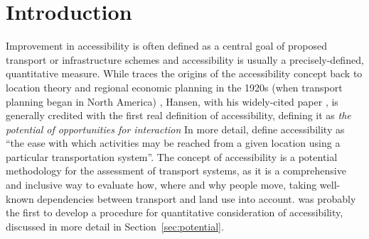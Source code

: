 \section{Introduction}
Improvement in accessibility is often defined as a central goal of proposed transport or infrastructure 
schemes \citep{GeursEtAl2012AccessibilityTransportIntroduction} and 
accessibility is usually a precisely-defined, quantitative measure. While 
\citet{Batty2009AccessibilityUnifiedTheory} traces the origins of the accessibility concept back to 
location theory and regional economic planning in the 1920s (when transport planning began in North America)
\citep{GeursEtAl2012AccessibilityTransportIntroduction}, 
Hansen, with his widely-cited paper \citep{Hansen1959HowAccessibilityShapesLandUse}, is generally credited 
with the first real definition of accessibility, defining it  
as \emph{the potential of opportunities for interaction} 
In more detail, \citet{MorrisEtAl1979AccessibilityIndicators} define accessibility as ``the ease with 
which activities may be reached from a given location using a particular transportation system''.
The concept of accessibility is a potential methodology for the assessment 
of transport systems, as it is a comprehensive and inclusive way to evaluate how, where and why 
people move, taking well-known dependencies between transport and land use into account.
\citet{Hansen1959HowAccessibilityShapesLandUse} was probably the first to develop a procedure for 
quantitative consideration of accessibility, discussed in more detail in Section~\ref{sec:potential}.



